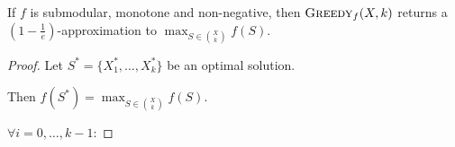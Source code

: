     \begin{theorem}
        If $f$ is submodular, monotone and non-negative, then $\textsc{Greedy}_f(X,k)$ returns a $(1 - \frac{1}{e})$-approximation to $\max_{S \in \binom{X}{k}} f(S)$.
    \end{theorem}

    \begin{proof}
        Let $S^* = \{ X_1^*, \dots, X_k^* \}$ be an optimal solution.
        
        Then $f(S^*) = \max_{S \in \binom{X}{k}} f(S)$.

        $\forall i = 0, \dots, k-1$:


\end{proof}

